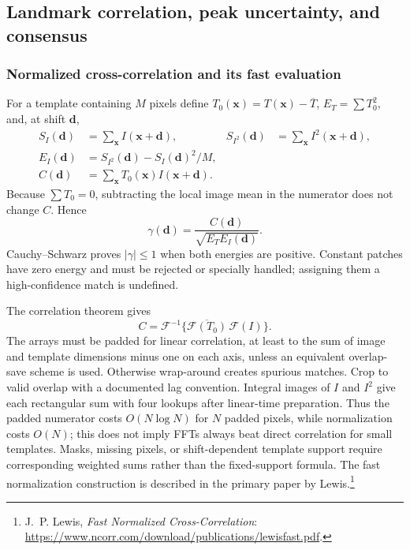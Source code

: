 \subsection{Landmark correlation, peak uncertainty, and consensus}

\subsubsection{Normalized cross-correlation and its fast evaluation}

For a template containing $M$ pixels define
$T_0(\boldsymbol x)=T(\boldsymbol x)-\overline T$,
$E_T=\sum T_0^2$, and, at shift $\boldsymbol d$,
\begin{align}
 S_I(\boldsymbol d)&=\sum_{\boldsymbol x}I(\boldsymbol x+\boldsymbol d),
 &S_{I^2}(\boldsymbol d)&=\sum_{\boldsymbol x}I^2(\boldsymbol x+\boldsymbol d),\\
 E_I(\boldsymbol d)&=S_{I^2}(\boldsymbol d)-S_I(\boldsymbol d)^2/M,\\
 C(\boldsymbol d)&=\sum_{\boldsymbol x}T_0(\boldsymbol x)
                                      I(\boldsymbol x+\boldsymbol d).
\end{align}
Because $\sum T_0=0$, subtracting the local image mean in the numerator
does not change $C$. Hence
\begin{equation}
 \gamma(\boldsymbol d)=\frac{C(\boldsymbol d)}{
                         \sqrt{E_T E_I(\boldsymbol d)}}.
 \label{eq:ncc-fast}
\end{equation}
Cauchy--Schwarz proves $|\gamma|\leq1$ when both energies are positive.
Constant patches have zero energy and must be rejected or specially
handled; assigning them a high-confidence match is undefined.

The correlation theorem gives
\begin{equation}
 C=\mathcal F^{-1}\{\overline{\mathcal F(T_0)}\,\mathcal F(I)\}.
\end{equation}
The arrays must be padded for linear correlation, at least to the sum
of image and template dimensions minus one on each axis, unless an
equivalent overlap-save scheme is used. Otherwise wrap-around creates
spurious matches. Crop to valid overlap with a documented lag convention.
Integral images of $I$ and $I^2$ give each rectangular sum with four
lookups after linear-time preparation. Thus the padded numerator costs
$O(N\log N)$ for $N$ padded pixels, while normalization costs $O(N)$;
this does not imply FFTs always beat direct correlation for small
templates. Masks, missing pixels, or shift-dependent template support
require corresponding weighted sums rather than the fixed-support
formula. The fast normalization construction is described in the primary
paper by Lewis.\footnote{J.~P. Lewis, \emph{Fast Normalized
Cross-Correlation}: \url{https://www.ncorr.com/download/publications/lewisfast.pdf}.}

